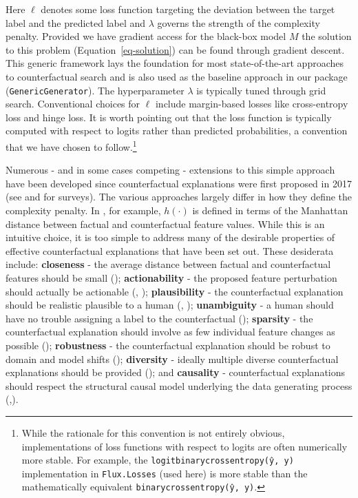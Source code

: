 \documentclass{juliacon}
\begin{document}
Here \(\ell\) denotes some loss function targeting the deviation between
the target label and the predicted label and \(\lambda\) governs the
strength of the complexity penalty. Provided we have gradient access for
the black-box model \(M\) the solution to this problem
(Equation~\ref{eq-solution}) can be found through gradient descent. This
generic framework lays the foundation for most state-of-the-art
approaches to counterfactual search and is also used as the baseline
approach in our package (\texttt{GenericGenerator}). The hyperparameter
\(\lambda\) is typically tuned through grid search. Conventional choices
for \(\ell\) include margin-based losses like cross-entropy loss and
hinge loss. It is worth pointing out that the loss function is typically
computed with respect to logits rather than predicted probabilities, a
convention that we have chosen to follow.\footnote{While the rationale
  for this convention is not entirely obvious, implementations of loss
  functions with respect to logits are often numerically more stable.
  For example, the \texttt{logitbinarycrossentropy(ŷ,\ y)}
  implementation in \texttt{Flux.Losses} (used here) is more stable than
  the mathematically equivalent \texttt{binarycrossentropy(ŷ,\ y)}.}

Numerous - and in some cases competing - extensions to this simple
approach have been developed since counterfactual explanations were
first proposed in 2017 (see \cite{verma2020counterfactual} and
\cite{karimi2020survey} for surveys). The various approaches largely
differ in how they define the complexity penalty. In
\cite{wachter2017counterfactual}, for example, \(h(\cdot)\) is defined
in terms of the Manhattan distance between factual and counterfactual
feature values. While this is an intuitive choice, it is too simple to
address many of the desirable properties of effective counterfactual
explanations that have been set out. These desiderata include:
\textbf{closeness} - the average distance between factual and
counterfactual features should be small
(\cite{wachter2017counterfactual}); \textbf{actionability} - the
proposed feature perturbation should actually be actionable
(\cite{ustun2019actionable}, \cite{poyiadzi2020face});
\textbf{plausibility} - the counterfactual explanation should be
realistic plausible to a human (\cite{joshi2019towards},
\cite{schut2021generating}); \textbf{unambiguity} - a human should have
no trouble assigning a label to the counterfactual
(\cite{schut2021generating}); \textbf{sparsity} - the counterfactual
explanation should involve as few individual feature changes as possible
(\cite{schut2021generating}); \textbf{robustness} - the counterfactual
explanation should be robust to domain and model shifts
(\cite{upadhyay2021towards}); \textbf{diversity} - ideally multiple
diverse counterfactual explanations should be provided
(\cite{mothilal2020explaining}); and \textbf{causality} - counterfactual
explanations should respect the structural causal model underlying the
data generating process
(\cite{karimi2020algorithmic},\cite{karimi2021algorithmic}).
\end{document}
